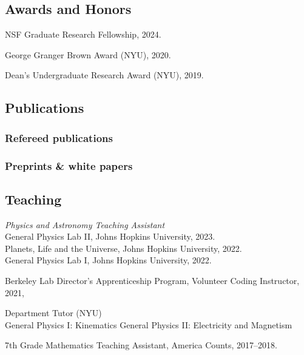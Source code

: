 \documentclass[12pt,letterpaper]{article}
\begin{document}
\subsection{Awards and Honors}
\begin{list}{}{\cvlist}

  \item NSF Graduate Research Fellowship, 2024.
  \item George Granger Brown Award (NYU), 2020.
  \item Dean's Undergraduate Research Award (NYU), 2019.

\end{list}

\ifdefined\withpubs
  \subsection{Publications}

  \subsubsection{Refereed publications}
  \begin{list}{}{\cvlist}
    
  \end{list}

  \subsubsection{Preprints \& white papers}
  \begin{list}{}{\cvlist}
    
  \end{list}
\fi

\subsection{Teaching}
\begin{list}{}{\cvlist}
  \item \emph{Physics and Astronomy Teaching Assistant} \\
      General Physics Lab II, Johns Hopkins University, 2023. \\
      Planets, Life and the Universe, Johns Hopkins University, 2022. \\
      General Physics Lab I, Johns Hopkins University, 2022.
    \item Berkeley Lab Director's Apprenticeship Program, Volunteer Coding Instructor, 2021,
    \item Department Tutor (NYU) \\
      General Physics I: Kinematics
      General Physics II: Electricity and Magnetism
    \item 7th Grade Mathematics Teaching Assistant, America Counts, 2017--2018.
\end{list}
\end{document}
